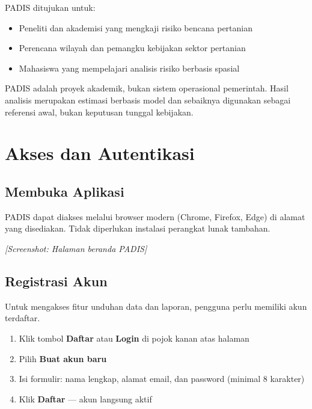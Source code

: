 \documentclass[12pt, a4paper]{article}
\newcommand{\screenshot}[1]{%
    \begin{center}
      \begin{tcolorbox}[
        enhanced,
        colback  = sectiongray,
        colframe = padisborder,
        arc      = 6pt,
        boxrule  = 0.6pt,
        height   = 5.5cm,
        valign   = center,
        halign   = center,
        fontupper = \sffamily\small\color{padismuted},
      ]
        \textit{[Screenshot: #1]}
      \end{tcolorbox}
    \end{center}%
  }
\begin{document}
  PADIS ditujukan untuk:
  \begin{itemize}
    \item Peneliti dan akademisi yang mengkaji risiko bencana pertanian
    \item Perencana wilayah dan pemangku kebijakan sektor pertanian
    \item Mahasiswa yang mempelajari analisis risiko berbasis spasial
  \end{itemize}

  \begin{notebox}
    PADIS adalah proyek akademik, bukan sistem operasional pemerintah. Hasil analisis
    merupakan estimasi berbasis model dan sebaiknya digunakan sebagai referensi awal,
    bukan keputusan tunggal kebijakan.
  \end{notebox}

  \newpage

  \section{Akses dan Autentikasi}

  \subsection{Membuka Aplikasi}

  PADIS dapat diakses melalui browser modern (Chrome, Firefox, Edge) di alamat yang
  disediakan. Tidak diperlukan instalasi perangkat lunak tambahan.

  \screenshot{Halaman beranda PADIS}

  \subsection{Registrasi Akun}

  Untuk mengakses fitur unduhan data dan laporan, pengguna perlu memiliki akun terdaftar.

  \begin{enumerate}
    \item Klik tombol \textbf{Daftar} atau \textbf{Login} di pojok kanan atas halaman
    \item Pilih \textbf{Buat akun baru}
    \item Isi formulir: nama lengkap, alamat email, dan password (minimal 8 karakter)
    \item Klik \textbf{Daftar} — akun langsung aktif
  \end{enumerate}
\end{document}

